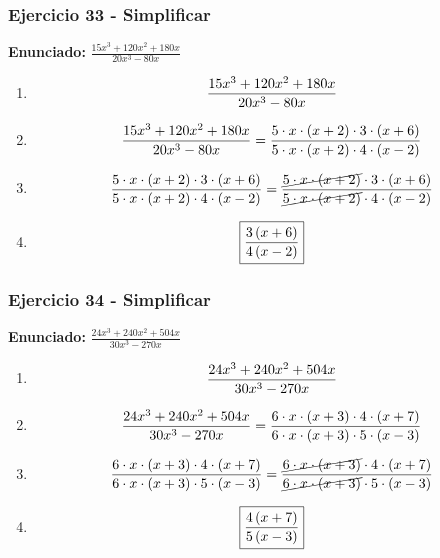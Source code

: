 \documentclass[11pt,a4paper]{article}
\newcommand{\fitmath}[1]{%
\[
\setbox0=\hbox{$\displaystyle #1$}%
\ifdim\wd0>\linewidth
\resizebox{\linewidth}{!}{$\displaystyle #1$}%
\else
#1%
\fi
\]
}
\begin{document}
\vspace{0.12cm}
\subsubsection*{Ejercicio 33 - Simplificar}
\textbf{Enunciado:} $ \frac{15 x^{3} + 120 x^{2} + 180 x}{20 x^{3} - 80 x} $\par
\begin{enumerate}[leftmargin=2em]
\item \fitmath{\frac{15 x^{3} + 120 x^{2} + 180 x}{20 x^{3} - 80 x}}
\item \fitmath{\frac{15 x^{3} + 120 x^{2} + 180 x}{20 x^{3} - 80 x}=\frac{5\cdot x\cdot \left(x + 2\right)\cdot 3\cdot \left(x + 6\right)}{5\cdot x\cdot \left(x + 2\right)\cdot 4\cdot \left(x - 2\right)}}
\item \fitmath{\frac{5\cdot x\cdot \left(x + 2\right)\cdot 3\cdot \left(x + 6\right)}{5\cdot x\cdot \left(x + 2\right)\cdot 4\cdot \left(x - 2\right)}=\frac{\cancel{5\cdot x\cdot \left(x + 2\right)}\cdot 3\cdot \left(x + 6\right)}{\cancel{5\cdot x\cdot \left(x + 2\right)}\cdot 4\cdot \left(x - 2\right)}}
\item \fitmath{\boxed{\frac{3 \left(x + 6\right)}{4 \left(x - 2\right)}}}
\end{enumerate}

\vspace{0.12cm}
\subsubsection*{Ejercicio 34 - Simplificar}
\textbf{Enunciado:} $ \frac{24 x^{3} + 240 x^{2} + 504 x}{30 x^{3} - 270 x} $\par
\begin{enumerate}[leftmargin=2em]
\item \fitmath{\frac{24 x^{3} + 240 x^{2} + 504 x}{30 x^{3} - 270 x}}
\item \fitmath{\frac{24 x^{3} + 240 x^{2} + 504 x}{30 x^{3} - 270 x}=\frac{6\cdot x\cdot \left(x + 3\right)\cdot 4\cdot \left(x + 7\right)}{6\cdot x\cdot \left(x + 3\right)\cdot 5\cdot \left(x - 3\right)}}
\item \fitmath{\frac{6\cdot x\cdot \left(x + 3\right)\cdot 4\cdot \left(x + 7\right)}{6\cdot x\cdot \left(x + 3\right)\cdot 5\cdot \left(x - 3\right)}=\frac{\cancel{6\cdot x\cdot \left(x + 3\right)}\cdot 4\cdot \left(x + 7\right)}{\cancel{6\cdot x\cdot \left(x + 3\right)}\cdot 5\cdot \left(x - 3\right)}}
\item \fitmath{\boxed{\frac{4 \left(x + 7\right)}{5 \left(x - 3\right)}}}
\end{enumerate}
\end{document}
